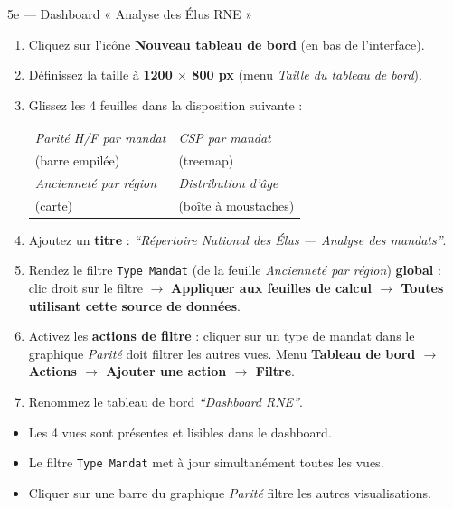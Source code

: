 \documentclass[11pt,a4paper]{article}
\begin{document}
\begin{exercice}{5e — Dashboard « Analyse des Élus RNE »}
\begin{enumerate}[leftmargin=*]
  \item Cliquez sur l'icône \textbf{Nouveau tableau de bord} (en bas de l'interface).
  \item Définissez la taille à \textbf{1200 $\times$ 800 px} (menu \textit{Taille du tableau de bord}).
  \item Glissez les 4 feuilles dans la disposition suivante :

\begin{center}
\begin{tabular}{|p{5.5cm}|p{5.5cm}|}
  \hline
  \textit{Parité H/F par mandat} & \textit{CSP par mandat} \\
  (barre empilée) & (treemap) \\
  \hline
  \textit{Ancienneté par région} & \textit{Distribution d'âge} \\
  (carte) & (boîte à moustaches) \\
  \hline
\end{tabular}
\end{center}

  \item Ajoutez un \textbf{titre} : \textit{``Répertoire National des Élus — Analyse des mandats''}.
  \item Rendez le filtre \texttt{Type Mandat} (de la feuille \textit{Ancienneté par région}) \textbf{global} : clic droit sur le filtre $\to$ \textbf{Appliquer aux feuilles de calcul $\to$ Toutes utilisant cette source de données}.
  \item Activez les \textbf{actions de filtre} : cliquer sur un type de mandat dans le graphique \textit{Parité} doit filtrer les autres vues. Menu \textbf{Tableau de bord $\to$ Actions $\to$ Ajouter une action $\to$ Filtre}.
  \item Renommez le tableau de bord \textit{``Dashboard RNE''}.
\end{enumerate}

\begin{validation}
\begin{itemize}[leftmargin=*]
  \item Les 4 vues sont présentes et lisibles dans le dashboard.
  \item Le filtre \texttt{Type Mandat} met à jour simultanément toutes les vues.
  \item Cliquer sur une barre du graphique \textit{Parité} filtre les autres visualisations.
\end{itemize}
\end{validation}
\end{exercice}
\end{document}
